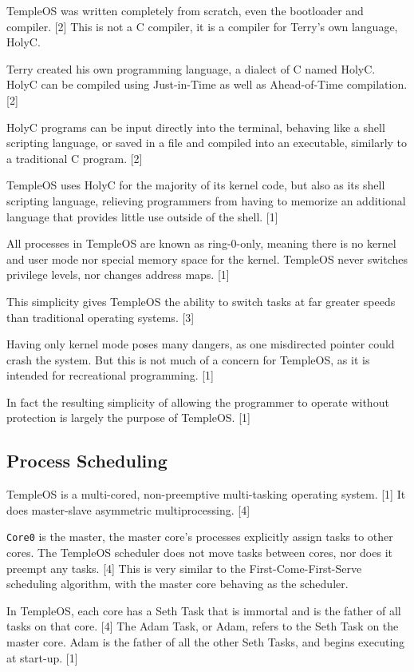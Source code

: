 \documentclass[11pt]{article}
\begin{document}
TempleOS was written completely from scratch, even the bootloader and
compiler. [2] This is not a C compiler, it is a compiler for Terry's own
language, HolyC.

Terry created his own programming language, a dialect of C named HolyC. HolyC
can be compiled using Just-in-Time as well as Ahead-of-Time compilation. [2]

HolyC programs can be input directly into the terminal, behaving like a shell
scripting language, or saved in a file and compiled into an executable,
similarly to a traditional C program. [2]

TempleOS uses HolyC for the majority of its kernel code, but also as
its shell scripting language, relieving programmers from having to memorize an
additional language that provides little use outside of the shell. [1]

All processes in TempleOS are known as ring-0-only, meaning there is no kernel
and user mode nor special memory space for the kernel. TempleOS never switches
privilege levels, nor changes address maps. [1]

This simplicity gives TempleOS the ability to switch tasks at far greater speeds
than traditional operating systems. [3]

Having only kernel mode poses many dangers, as one misdirected pointer could
crash the system. But this is not much of a concern for TempleOS, as it is
intended for recreational programming. [1]

In fact the resulting simplicity of allowing the programmer to operate without
protection is largely the purpose of TempleOS. [1]

 \newpage

\subsection{Process Scheduling}
\label{sec:org040e96c}

TempleOS is a multi-cored, non-preemptive multi-tasking operating system. [1] It
does master-slave asymmetric multiprocessing. [4]

\texttt{Core0} is the master, the master core's processes explicitly assign tasks to
other cores. The TempleOS scheduler does not move tasks between cores, nor does
it preempt any tasks. [4] This is very similar to the First-Come-First-Serve
scheduling algorithm, with the master core behaving as the scheduler.

In TempleOS, each core has a Seth Task that is immortal and is the father of all
tasks on that core. [4] The Adam Task, or Adam, refers to the Seth Task on the
master core. Adam is the father of all the other Seth Tasks, and begins
executing at start-up. [1]
\end{document}
